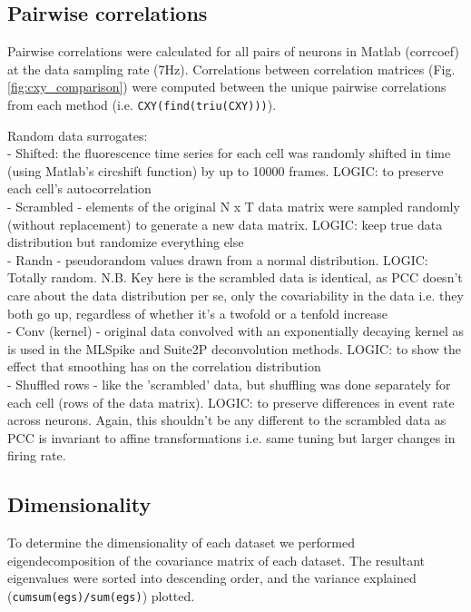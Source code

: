 \documentclass[a4paper,10pt,twocolumn]{article}
\begin{document}
\subsection{Pairwise correlations}
Pairwise correlations were calculated for all pairs of neurons in Matlab (corrcoef) at the data sampling rate (7Hz). Correlations between correlation matrices (Fig. \ref{fig:cxy_comparison}) were computed between the unique pairwise correlations from each method (i.e. {\tt CXY(find(triu(CXY)))}).

Random data surrogates: \\ 
\indent - Shifted: the fluorescence time series for each cell was randomly shifted in time (using Matlab's circshift function) by up to 10000 frames. LOGIC: to preserve each cell's autocorrelation\\
\indent - Scrambled - elements of the original N x T data matrix were sampled randomly (without replacement) to generate a new data matrix. LOGIC: keep true data distribution but randomize everything else\\
\indent - Randn - pseudorandom values drawn from a normal distribution. LOGIC: Totally random. N.B. Key here is the scrambled data is identical, as PCC doesn't care about the data distribution per se, only the covariability in the data i.e. they both go up, regardless of whether it's a twofold or a tenfold increase\\
\indent - Conv (kernel) - original data convolved with an exponentially decaying kernel as is used in the MLSpike and Suite2P deconvolution methods. LOGIC: to show the effect that smoothing has on the correlation distribution \\
\indent - Shuffled rows - like the 'scrambled' data, but shuffling was done separately for each cell (rows of the data matrix). LOGIC: to preserve differences in event rate across neurons. Again, this shouldn't be any different to the scrambled data as PCC is invariant to affine transformations i.e. same tuning but larger changes in firing rate.\\


\subsection{Dimensionality}
To determine the dimensionality of each dataset we performed eigendecomposition of the covariance matrix of each dataset. The resultant eigenvalues were sorted into descending order, and the variance explained ({\tt cumsum(egs)/sum(egs)}) plotted.
\end{document}
